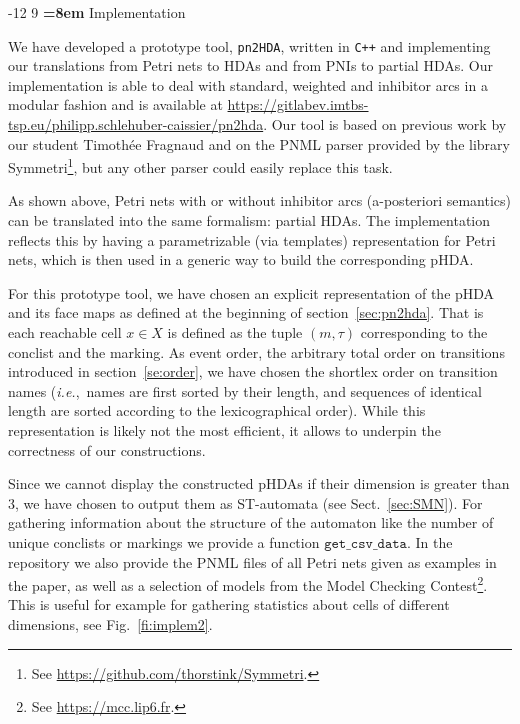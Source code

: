 \documentclass[runningheads,envcountsame]{llncs}
\makeatletter
\newcommand*\ie{\textit{i.e.},}
\renewcommand\section{\@startsection{section}{1}{\z@}%
  {-12\p@ \@plus -3\p@ \@minus -3\p@}%
  {9\p@ \@plus 3\p@ \@minus 3\p@}%
  {\normalfont\large\bfseries\boldmath
    \rightskip=\z@ \@plus 8em\pretolerance=10000 }}
\makeatother
\begin{document}
\section{Implementation}
\label{sec:implem}

We have developed a prototype tool, \texttt{pn2HDA}, written in \texttt{C++} and
implementing our translations from Petri nets to HDAs and from PNIs to partial HDAs.
Our implementation is able to deal with standard, weighted and inhibitor
arcs in a modular fashion and is available at
\url{https://gitlabev.imtbs-tsp.eu/philipp.schlehuber-caissier/pn2hda}.
Our tool is based on previous work by our student Timothée Fragnaud
and on the PNML parser provided by the library Symmetri\footnote{See \url{https://github.com/thorstink/Symmetri}.},
but any other parser could easily replace this task.

As shown above, Petri nets with or without inhibitor arcs (a-posteriori semantics) can be translated into 
the same formalism: partial HDAs.
The implementation reflects this by having a parametrizable (via templates)
representation for Petri nets, which is then used in a generic way to build
the corresponding pHDA.

For this prototype tool, we have chosen an explicit representation of the pHDA
and its face maps as defined at the beginning of section~\ref{sec:pn2hda}. 
That is each reachable cell $x \in X$ is defined as the tuple $(m, \tau)$ 
corresponding to the conclist and the marking.
As event order, the arbitrary total order on transitions introduced in 
section~\ref{se:order}, we have chosen the shortlex order on transition names
(\ie~names are first sorted by their length, and sequences of identical length are sorted according to the lexicographical order).
While this representation is likely not the most efficient, it allows to underpin the 
correctness of our constructions.

Since we cannot display the constructed pHDAs if their dimension is greater
than 3, we have chosen to output them as ST-automata (see Sect.~\ref{sec:SMN}).
For gathering information about the structure of the automaton 
like the number of unique conclists or markings we provide a function $\texttt{get\_csv\_data}$.
%
In the repository we also provide the PNML files of all Petri nets given
as examples in the paper, as well as a selection of models from the Model Checking Contest\footnote{%
  See \url{https://mcc.lip6.fr}.}.
This is useful for example for gathering statistics about cells of different dimensions,
see Fig.~\ref{fi:implem2}.
\end{document}
